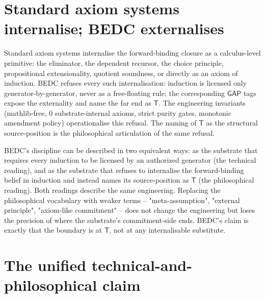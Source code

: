 \section{Standard axiom systems internalise; BEDC externalises}
\label{sec:certificate-closure-standard-vs-bedc}

\begin{principle}
\label{prin:certificate-closure-distinguishing-choice}
Standard axiom systems internalise the forward-binding closure as a calculus-level primitive: the eliminator, the dependent recursor, the choice principle, propositional extensionality, quotient soundness, or directly as an axiom of induction. BEDC refuses every such internalisation: induction is licensed only generator-by-generator, never as a free-floating rule; the corresponding $\mathsf{GAP}$ tags expose the externality and name the far end as $\mathsf{T}$. The engineering invariants (mathlib-free, 0 substrate-internal axioms, strict purity gates, monotonic amendment policy) operationalise this refusal. The naming of $\mathsf{T}$ as the structural source-position is the philosophical articulation of the same refusal.
\end{principle}

\begin{remark}
\label{rem:certificate-closure-bedc-not-softening}
BEDC's discipline can be described in two equivalent ways: as the substrate that requires every induction to be licensed by an authorized generator (the technical reading), and as the substrate that refuses to internalise the forward-binding belief in induction and instead names its source-position as $\mathsf{T}$ (the philosophical reading). Both readings describe the same engineering. Replacing the philosophical vocabulary with weaker terms -- "meta-assumption", "external principle", "axiom-like commitment" -- does not change the engineering but loses the precision of where the substrate's commitment-side ends. BEDC's claim is exactly that the boundary is at $\mathsf{T}$, not at any internalisable substitute.
\end{remark}

\section{The unified technical-and-philosophical claim}
\label{sec:certificate-closure-unified-technical-and-philosophical}


